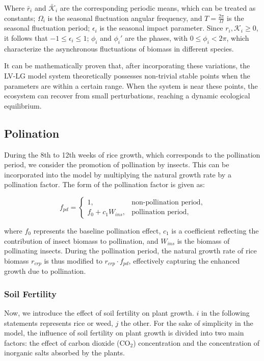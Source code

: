 \documentclass{HZNUMCM}
\begin{document}
        Where $\bar{r}_i$ and $\bar{\mathscr{K}}_i$ are the corresponding periodic means, 
        which can be treated as constants; $\Omega_i$ is the seasonal fluctuation angular frequency, 
        and $T = \frac{2\pi}{\Omega}$ is the seasonal fluctuation period; 
        $\epsilon_i$ is the seasonal impact parameter. Since $r_i, \mathscr{K}_i \geqslant 0$, 
        it follows that $-1 \leqslant \epsilon_i \leqslant 1$; $\phi_i$ and $\phi_i'$ are the phases, 
        with $0 \leqslant \phi_i < 2\pi$, which characterize the asynchronous fluctuations of biomass in different species.

        It can be mathematically proven that, after incorporating these variations, 
        the LV-LG model system theoretically possesses non-trivial stable points when the parameters are within a certain range. 
        When the system is near these points, the ecosystem can recover from small perturbations, 
        reaching a dynamic ecological equilibrium.
      \subsection{Polination}
        During the 8th to 12th weeks of rice growth, which corresponds to the pollination period, we consider the promotion of pollination by insects. This can be incorporated into the model by multiplying the natural growth rate by a pollination factor. The form of the pollination factor is given as:

        \[
        f_{pd} =
        \begin{cases}
        1, & \text{non-pollination period}, \\
        f_0 + c_1 W_{ins}, & \text{pollination period},
        \end{cases}
        \]
        
        where \( f_0 \) represents the baseline pollination effect, \( c_1 \) is a coefficient reflecting the contribution of insect biomass to pollination, and \( W_{ins} \) is the biomass of pollinating insects. During the pollination period, the natural growth rate of rice biomass \( r_{crp} \) is thus modified to \( r_{crp} \cdot f_{pd} \), effectively capturing the enhanced growth due to pollination.
      
      \subsubsection{Soil Fertility}
        Now, we introduce the effect of soil fertility on plant growth.
        $i$ in the following statements represents rice or weed, $j$ the other.
        For the sake of simplicity in the model, 
        the influence of soil fertility on plant growth is divided into two main factors: 
        the effect of carbon dioxide (CO$_2$) concentration and the concentration of inorganic salts absorbed by the plants.
\end{document}

